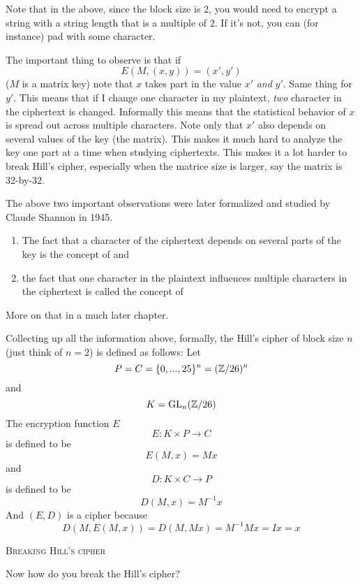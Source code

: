 

Note that in the above, since the block size is 2, you would need to
encrypt a string with a string length that is a multiple of $2$.
If it's not, you can (for instance) pad with some character.

The important thing to observe is that if
\[
  E(M, (x, y)) = (x', y')
  \]
  ($M$ is a matrix key)
note that $x$ takes part in the value $x'$ \textit{and} $y'$.
Same thing for $y'$.
This means that if I change one character in my plaintext, \textit{two}
character in the ciphertext is changed.
Informally this means that the statistical behavior of $x$
is spread out across multiple characters.
Note only that $x'$ also depends on several values of the key (the matrix).
This makes it much hard to analyze the key one part at a time when
studying ciphertexts.
This makes it a lot harder to break Hill's cipher, especially when
the matrice size is larger, say the matrix is 32-by-32.

The above two important observations
were later formalized and studied by Claude Shannon in 1945.
\begin{enumerate}[nosep]
\item The fact that a character of the ciphertext
depends on several parts of the key is the
concept of
and
\item the fact that one character in the plaintext
influences multiple characters in the ciphertext
is called the concept of
\end{enumerate}
More on that in a much later chapter.






Collecting up all the information above,
formally, the Hill's cipher of block size $n$ (just think of $n = 2$)
is defined as follows:
Let
\[
P = C = \{0,...,25\}^n = (\mathbb Z/26)^n
\]
and
\[
K = \operatorname{GL}_n(\mathbb Z/26)
\]
The encryption function $E$
\[
E : K \times P \rightarrow C
\]
is defined to be
\[
E(M, x) = Mx
\]
and
\[
D : K \times C \rightarrow P
\]
is defined to be
\[
D(M, x) = M^{-1}x
\]
And $(E,D)$ is a cipher because
\[
D(M, E(M, x)) = D(M, Mx) = M^{-1}Mx = Ix = x
\]



\newpage
\textsc{Breaking Hill's cipher}

Now how do you break the Hill's cipher?

